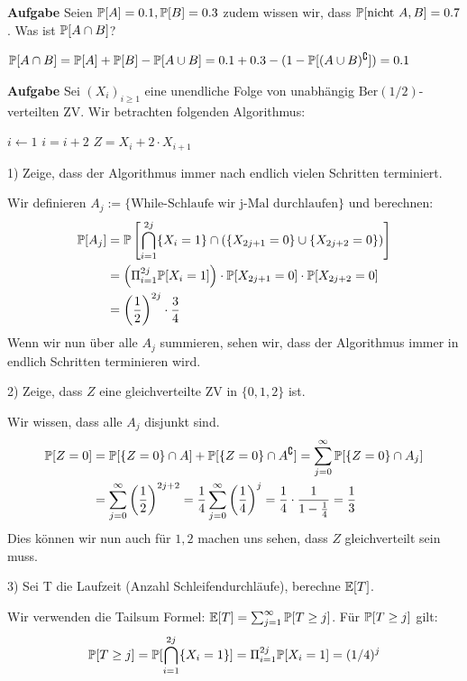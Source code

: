 \hrulefill

\textbf{Aufgabe}
Seien $\mathbb{P}[A] = 0.1, \mathbb{P}[B] = 0.3$ zudem wissen wir, dass $\mathbb{P}[\text{nicht } A, B] = 0.7$. Was ist $\mathbb{P}[A \cap B]$? \smallskip

$\mathbb{P}[A \cap B] = \mathbb{P}[A] + \mathbb{P}[B] - \mathbb{P}[A \cup B] = 0.1 + 0.3 - (1 - \mathbb{P}[(A \cup B)^\complement]) = 0.1$

\hrulefill

\textbf{Aufgabe}
Sei $(X_i)_{i \geq 1}$ eine unendliche Folge von unabhängig $\text{Ber}(1/2)$-verteilten ZV. Wir betrachten folgenden Algorithmus:

\begin{algorithmic}
	\State $i \gets 1$
		\State $i = i + 2$
	\EndWhile
	\State \Return $Z = X_i + 2 \cdot X_{i+1}$
\end{algorithmic}

1) Zeige, dass der Algorithmus immer nach endlich vielen Schritten terminiert. 

Wir definieren $A_j := \{ \text{While-Schlaufe wir j-Mal durchlaufen} \}$ und berechnen:
\begin{align*}
	\mathbb{P}[A_j] &= \mathbb{P} \left[ \bigcap_{i=1}^{2j} \{X_i = 1\} \cap (\{X_{2j+1} = 0\} \cup \{X_{2j+2} = 0\}) \right] \\
	&= \left( \Pi_{i=1}^{2j} \mathbb{P}[X_i = 1] \right) \cdot \mathbb{P}[X_{2j+1} = 0] \cdot \mathbb{P}[X_{2j+2} = 0] \\
	&= \left(\frac{1}{2}\right)^{2j} \cdot \frac{3}{4}
\end{align*}
Wenn wir nun über alle $A_j$ summieren, sehen wir, dass der Algorithmus immer in endlich Schritten terminieren wird. \smallskip

2) Zeige, dass $Z$ eine gleichverteilte ZV in $\{0,1,2\}$ ist.

Wir wissen, dass alle $A_j$ disjunkt sind.
\begin{align*}
	\mathbb{P}[Z=0] &= \mathbb{P}[\{Z=0\} \cap A] + \mathbb{P}[\{Z=0\} \cap A^\complement] = \sum\limits_{j=0}^\infty \mathbb{P}[\{Z=0\} \cap A_j] \\
	&= \sum\limits_{j=0}^\infty \left(\frac{1}{2}\right)^{2j + 2} = \frac{1}{4}\sum\limits_{j=0}^\infty \left(\frac{1}{4}\right)^{j} = \frac{1}{4} \cdot \frac{1}{1 - \frac{1}{4}} = \frac{1}{3}
\end{align*}
Dies können wir nun auch für $1,2$ machen uns sehen, dass $Z$ gleichverteilt sein muss. \smallskip

3) Sei T die Laufzeit (Anzahl Schleifendurchläufe), berechne $\mathbb{E}[T]$.

Wir verwenden die Tailsum Formel: $\mathbb{E}[T] = \sum_{j=1}^\infty \mathbb{P}[T \geq j]$. Für $\mathbb{P}[T \geq j]$ gilt:
$$\mathbb{P}[T \geq j] = \mathbb{P}[\bigcap_{i=1}^{2j} \{X_i = 1\}] = \Pi_{i=1}^{2j} \mathbb{P}[X_i = 1] = (1/4)^j$$

